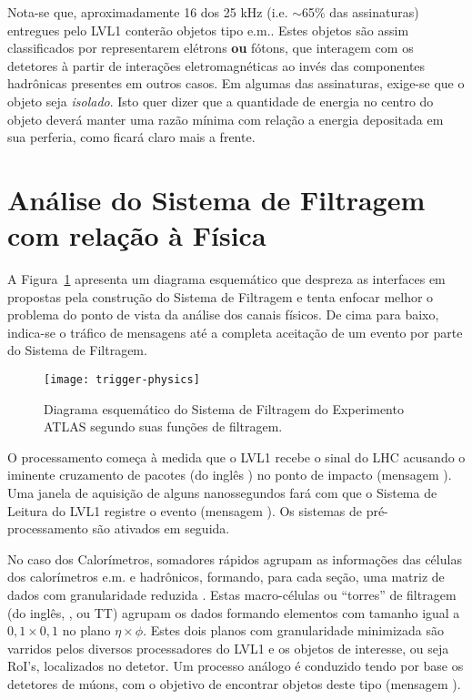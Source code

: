 Nota-se que, aproximadamente 16 dos 25 kHz (i.e. $\sim$65\% das assinaturas)
entregues pelo LVL1 conterão objetos tipo e.m.. Estes objetos são assim
classificados por representarem elétrons \textbf{ou} fótons, que interagem com
os detetores à partir de interações eletromagnéticas ao invés das componentes
hadrônicas presentes em outros casos. Em algumas das assinaturas, exige-se que
o objeto seja \emph{isolado}. Isto quer dizer que a quantidade de energia no
centro do objeto deverá manter uma razão mínima com relação a energia
depositada em sua perferia, como ficará claro mais a frente.

\section{Análise do Sistema de Filtragem com relação à Física}

A Figura~\ref{fig:trigger-physics} apresenta um diagrama esquemático que
despreza as interfaces em  propostas pela construção do Sistema
de Filtragem e tenta enfocar melhor o problema do ponto de vista da análise
dos canais físicos. De cima para baixo, indica-se o tráfico de mensagens até a
completa aceitação de um evento por parte do Sistema de Filtragem.

\begin{figure}
\begin{center}
\texttt{[image: trigger-physics]}
\end{center}
\caption{Diagrama esquemático do Sistema de Filtragem do Experimento ATLAS
segundo suas funções de filtragem.}
\label{fig:trigger-physics}
\end{figure}

O processamento começa à medida que o LVL1 recebe o sinal do LHC acusando o
iminente cruzamento de pacotes (do inglês ) no ponto de
impacto (mensagem ). Uma janela de aquisição de alguns nanossegundos
fará com que o Sistema de Leitura do LVL1 registre o evento (mensagem
). Os sistemas de pré-processamento são ativados em seguida.

No caso dos Calorímetros, somadores rápidos \cite{seixas:adder} agrupam as
informações das células dos calorímetros e.m. e hadrônicos, formando, para
cada seção, uma matriz de dados com granularidade reduzida
\cite{l1-tdr}. Estas macro-células ou ``torres'' de filtragem (do inglês,
, ou TT) agrupam os dados formando elementos com tamanho
igual a $0,1\times0,1$ no plano $\eta\times\phi$. Estes dois planos com
granularidade minimizada são varridos pelos diversos processadores do LVL1 e
os objetos de interesse, ou seja RoI's, localizados no detetor. Um processo
análogo é conduzido tendo por base os detetores de múons, com o objetivo de
encontrar objetos deste tipo (mensagem ).

